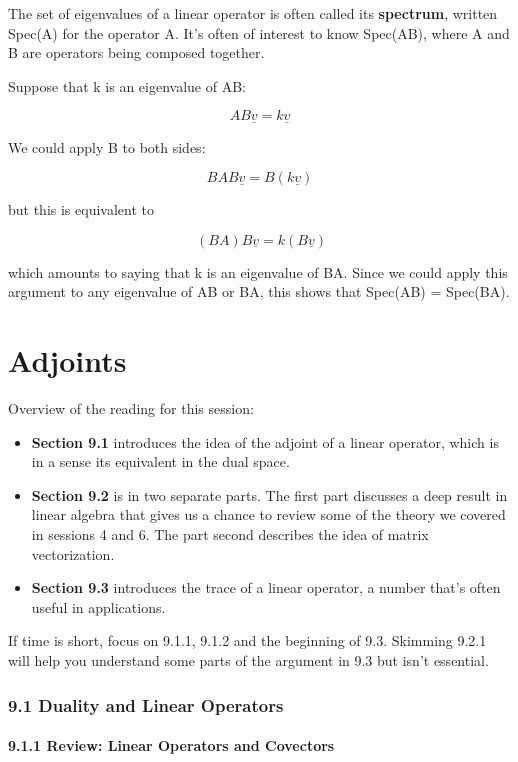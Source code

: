 \documentclass[oneside,english]{amsbook}
\numberwithin{section}{chapter}
\theoremstyle{plain}
\theoremstyle{definition}
\begin{document}
The set of eigenvalues of a linear operator is often called its
\textbf{spectrum}, written Spec(A) for the operator A. It's often of
interest to know Spec(AB), where A and B are operators being composed
together.

Suppose that k is an eigenvalue of AB:

\[AB\underline{v} = k\underline{v}\]

We could apply B to both sides:

\[BAB\underline{v} = B\left( k\underline{v} \right)\]

but this is equivalent to

\[\ (BA)B\underline{v} = k(B\underline{v})\]

which amounts to saying that k is an eigenvalue of BA. Since we could
apply this argument to any eigenvalue of AB or BA, this shows that
Spec(AB) = Spec(BA).

\chapter{Adjoints}

Overview of the reading for this session:

\begin{itemize}
	\item
	\textbf{Section 9.1} introduces the idea of the adjoint of a linear
	operator, which is in a sense its equivalent in the dual space.
	\item
	\textbf{Section 9.2} is in two separate parts. The first part
	discusses a deep result in linear algebra that gives us a chance to
	review some of the theory we covered in sessions 4 and 6. The part
	second describes the idea of matrix vectorization.
	\item
	\textbf{Section 9.3} introduces the trace of a linear operator, a
	number that's often useful in applications.
\end{itemize}

If time is short, focus on 9.1.1, 9.1.2 and the beginning of 9.3.
Skimming 9.2.1 will help you understand some parts of the argument in
9.3 but isn't essential.

\subsection{9.1 Duality and Linear
	Operators}\label{duality-and-linear-operators}

\subsubsection{9.1.1 Review: Linear Operators and
	Covectors}\label{review-linear-operators-and-covectors}
\end{document}

